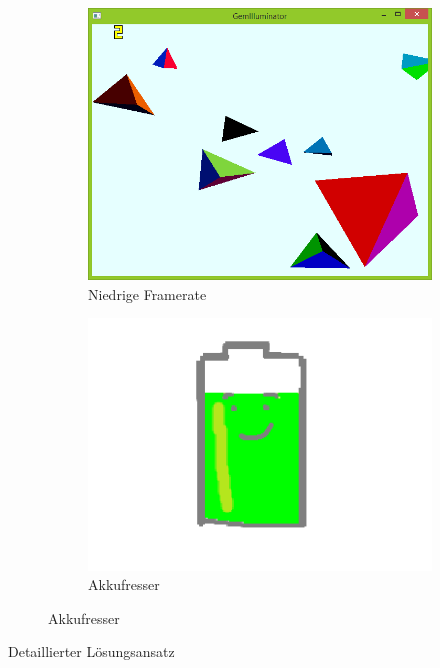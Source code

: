 {
	\begin{figure}
		\centering
		\begin{subfigure}{\textwidth}
			\centering
			\includegraphics[width=\textwidth, height=0.3\textheight, keepaspectratio]{images/lowFPS}
			\caption{Niedrige Framerate}
		\end{subfigure}
		\begin{subfigure}{\textwidth}
			\centering
			\includegraphics[width=\textwidth, height=0.3\textheight, keepaspectratio]{images/akkufresser2}
			\caption{Akkufresser}
		\end{subfigure}
	\end{figure}
}


\begin{frame}{Detaillierter Lösungsansatz}

\end{frame}



